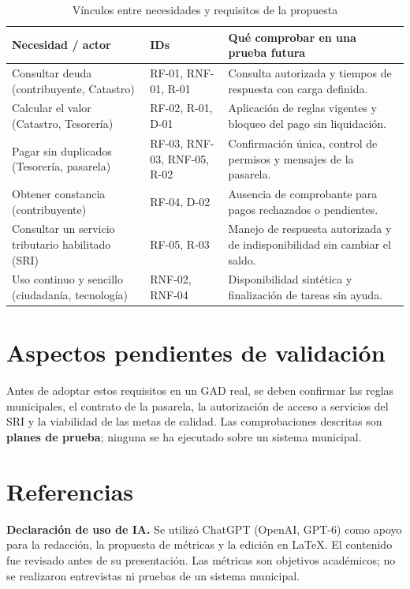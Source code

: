 \documentclass[10pt,onecolumn]{IEEEtran}
\begin{document}
\begin{table}[htbp]
\centering
\footnotesize
\caption{Vínculos entre necesidades y requisitos de la propuesta}
\label{tab:traza}
\begin{tabularx}{\linewidth}{@{}p{2.8cm}p{2.1cm}Y@{}}
\toprule
\textbf{Necesidad / actor} & \textbf{IDs} & \textbf{Qué comprobar en una prueba futura}\\
\midrule
Consultar deuda (contribuyente, Catastro) & RF-01, RNF-01, R-01 & Consulta autorizada y tiempos de respuesta con carga definida.\\
Calcular el valor (Catastro, Tesorería) & RF-02, R-01, D-01 & Aplicación de reglas vigentes y bloqueo del pago sin liquidación.\\
Pagar sin duplicados (Tesorería, pasarela) & RF-03, RNF-03, RNF-05, R-02 & Confirmación única, control de permisos y mensajes de la pasarela.\\
Obtener constancia (contribuyente) & RF-04, D-02 & Ausencia de comprobante para pagos rechazados o pendientes.\\
Consultar un servicio tributario habilitado (SRI) & RF-05, R-03 & Manejo de respuesta autorizada y de indisponibilidad sin cambiar el saldo.\\
Uso continuo y sencillo (ciudadanía, tecnología) & RNF-02, RNF-04 & Disponibilidad sintética y finalización de tareas sin ayuda.\\
\bottomrule
\end{tabularx}
\end{table}

\section{Aspectos pendientes de validación}
Antes de adoptar estos requisitos en un GAD real, se deben confirmar las reglas municipales, el contrato de la pasarela, la autorización de acceso a servicios del SRI y la viabilidad de las metas de calidad. Las comprobaciones descritas son \textbf{planes de prueba}; ninguna se ha ejecutado sobre un sistema municipal.

\section*{Referencias}
\printbibliography[heading=none]

\noindent\footnotesize\textbf{Declaración de uso de IA.} Se utilizó ChatGPT (OpenAI, GPT-6) como apoyo para la redacción, la propuesta de métricas y la edición en LaTeX. El contenido fue revisado antes de su presentación. Las métricas son objetivos académicos; no se realizaron entrevistas ni pruebas de un sistema municipal.
\end{document}
